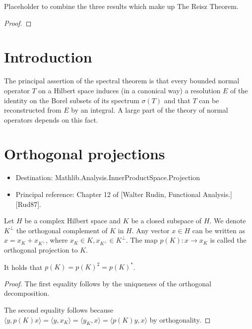 \begin{theorem}
  \label{thm:ComplexRMK}
  Placeholder to combine the three results which make up The Reisz Theorem.
\end{theorem}
\begin{proof}
\end{proof}


\chapter{Introduction}

The principal assertion of the spectral theorem is that every bounded normal operator $T$ on a Hilbert space induces (in a canonical way) a resolution $E$ of the identity on the Borel subsets of its spectrum $\sigma(T)$ and that $T$ can be reconstructed from $E$ by an integral.
A large part of the theory of normal operators depends on this fact.


\chapter{Orthogonal projections}


\begin{itemize}
  \item Destination: Mathlib.Analysis.InnerProductSpace.Projection
  \item Principal reference: Chapter 12 of [Walter Rudin, Functional Analysis.][Rud87].
\end{itemize}

Let $H$ be a complex Hilbert space and $K$ be a closed subspace of $H$.
We denote $K^\perp$ the orthogonal complement of $K$ in $H$.
Any vector $x \in H$ can be written as $x = x_K + x_{K^\perp}$, where $x_K \in K, x_{K^\perp} \in K^\perp$.
The map $p(K) : x \to x_K$ is called the orthogonal projection to $K$.
\begin{lemma}
  \label{lem:projection_projection}
  It holds that $p(K) = p(K)^2 = p(K)^*$.
\end{lemma}

\begin{proof}
  The first equality follows by the uniqueness of the orthogonal decomposition.

  The second equality follows because $\langle y, p(K)x \rangle = \langle y, x_K\rangle = \langle y_K, x \rangle = \langle p(K)y, x\rangle$
  by orthogonality.
\end{proof}

